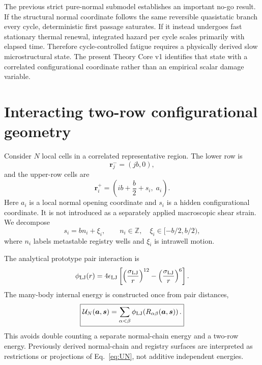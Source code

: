 \documentclass[11pt]{article}
\begin{document}
The previous strict pure-normal submodel establishes an important no-go result. If the structural normal coordinate follows the same reversible quasistatic branch every cycle, deterministic first passage saturates. If it instead undergoes fast stationary thermal renewal, integrated hazard per cycle scales primarily with elapsed time. Therefore cycle-controlled fatigue requires a physically derived slow microstructural state. The present Theory Core v1 identifies that state with a correlated configurational coordinate rather than an empirical scalar damage variable.

\section{Interacting two-row configurational geometry}
Consider $N$ local cells in a correlated representative region. The lower row is
\begin{equation}
 \bm r_j^-=(jb,0),
\end{equation}
and the upper-row cells are
\begin{equation}
 \bm r_i^+=\left(ib+\frac{b}{2}+s_i,\;a_i\right).
\end{equation}
Here $a_i$ is a local normal opening coordinate and $s_i$ is a hidden configurational coordinate. It is not introduced as a separately applied macroscopic shear strain. We decompose
\begin{equation}
 \boxed{s_i=b n_i+\xi_i},
 \qquad
 n_i\in\mathbb Z,\quad
 \xi_i\in[-b/2,b/2),
 \label{eq:sdecomp}
\end{equation}
where $n_i$ labels metastable registry wells and $\xi_i$ is intrawell motion.

The analytical prototype pair interaction is
\begin{equation}
 \phi_{\rm LJ}(r)
 =4\epsilon_{\rm LJ}
 \left[
 \left(\frac{\sigma_{\rm LJ}}{r}\right)^{12}
 -
 \left(\frac{\sigma_{\rm LJ}}{r}\right)^6
 \right].
\end{equation}
The many-body internal energy is constructed once from pair distances,
\begin{equation}
 \boxed{
 \mathcal U_N(\bm a,\bm s)
 =
 \sum_{\alpha<\beta}
 \phi_{\rm LJ}\!\left(R_{\alpha\beta}(\bm a,\bm s)\right).
 }
 \label{eq:UN}
\end{equation}
This avoids double counting a separate normal-chain energy and a two-row energy. Previously derived normal-chain and registry surfaces are interpreted as restrictions or projections of Eq.~\eqref{eq:UN}, not additive independent energies.
\end{document}
